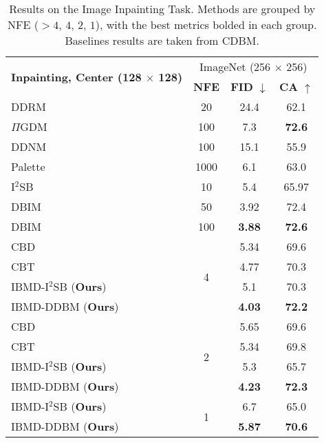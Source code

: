 \begin{table}[t]
\vspace{-2mm}
\centering
\caption{Results on the Image Inpainting Task. Methods are grouped by NFE ($> 4$, $4$, $2$, $1$), with the best metrics bolded in each group. Baselines results are taken from CDBM.}
\label{tab:image_inpainting_results}
\begin{tabular}{lccc}
\hline
\multirow{2}{*}{\textbf{Inpainting, Center (128 $\times$ 128)}} & \multicolumn{3}{c}{ImageNet (256 $\times$ 256)} \\ \cline{2-4} 
                             & \textbf{NFE}    & \textbf{FID} $\downarrow$  & \textbf{CA} $\uparrow$ \\ \hline
DDRM \cite{kawar2022denoising}     & 20     & 24.4             & 62.1          \\
$\Pi$GDM \cite{song2023pseudoinverse}   & 100    & 7.3              &  \textbf{72.6}          \\
DDNM \cite{wang2022zero}     & 100    & 15.1             & 55.9          \\
Palette \cite{saharia2022palette} & 1000  & 6.1              & 63.0          \\
I$^2$SB \cite{liu20232}   & 10   & 5.4              & 65.97          \\
DBIM \cite{zheng2024diffusion}                & 50    & 3.92             & 72.4          \\
DBIM \cite{zheng2024diffusion}                & 100    & \textbf{3.88}             & \textbf{72.6}          \\ \hline
CBD \cite{he2024consistency}                & \multirow{4}{*}{4}    & 5.34             & 69.6          \\
CBT \cite{he2024consistency}                &     & 4.77             & 70.3          \\
IBMD-I$^2$SB (\textbf{Ours})                 &     & 5.1             & 70.3          \\
IBMD-DDBM (\textbf{Ours})              &      & \textbf{4.03}             & \textbf{72.2}          \\ \hline
CBD \cite{he2024consistency}                & \multirow{4}{*}{2}    & 5.65             & 69.6          \\ 
CBT \cite{he2024consistency}                &     & 5.34             & 69.8          \\ 
IBMD-I$^2$SB (\textbf{Ours})                &     & 5.3             &  65.7          \\ 
IBMD-DDBM (\textbf{Ours})              &      & \textbf{4.23}             & \textbf{72.3}          \\ \hline
IBMD-I$^2$SB (\textbf{Ours})              & \multirow{2}{*}{1}     &  6.7          & 65.0          \\
IBMD-DDBM (\textbf{Ours})              &      & \textbf{5.87}             & \textbf{70.6}         \\ \hline
\end{tabular}
\vspace{-6mm}
\end{table}
